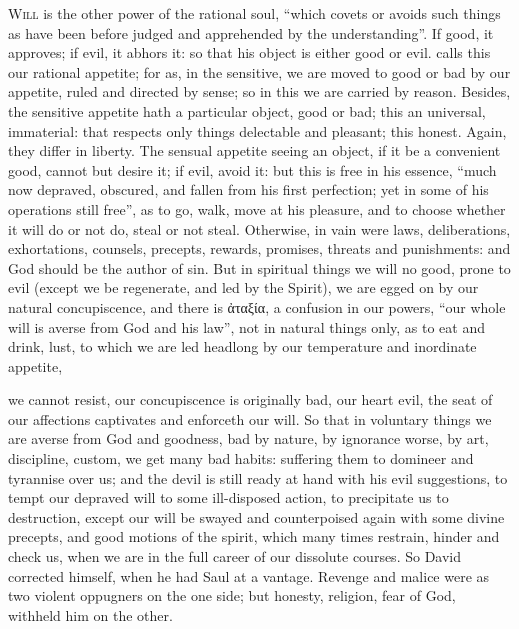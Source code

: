 \lettrine{W}{ill} is the other power of the rational soul,
\enquote{which covets or avoids such things as have been before
judged and apprehended by the understanding}. If good, it approves; if evil, it
abhors it: so that his object is either good or evil. \Aristotle{} calls this our
rational appetite; for as, in the sensitive, we are moved to good or bad by our
appetite, ruled and directed by sense; so in this we are carried by reason.
Besides, the sensitive appetite hath a particular object, good or bad; this an
universal, immaterial: that respects only things delectable and pleasant; this
honest. Again, they differ in liberty. The sensual appetite seeing an object,
if it be a convenient good, cannot but desire it; if evil, avoid it: but this
is free in his essence, \enquote{much now depraved, obscured, and
fallen from his first perfection; yet in some of his operations still free}, as
to go, walk, move at his pleasure, and to choose whether it will do or not do,
steal or not steal. Otherwise, in vain were laws, deliberations, exhortations,
counsels, precepts, rewards, promises, threats and punishments: and God should
be the author of sin. But in spiritual things we will no
good, prone to evil (except we be regenerate, and led by the Spirit), we are
egged on by our natural concupiscence, and there is \textgreek{ἀταξία}, a
confusion in our powers, \enquote{our whole will is averse from
God and his law}, not in natural things only, as to eat and drink, lust, to
which we are led headlong by our temperature and inordinate appetite,


we cannot resist, our concupiscence is originally bad, our heart evil, the seat
of our affections captivates and enforceth our will. So that in voluntary
things we are averse from God and goodness, bad by nature, by
ignorance worse, by art, discipline, custom, we get many
bad habits: suffering them to domineer and tyrannise over us; and the devil is
still ready at hand with his evil suggestions, to tempt our depraved will to
some ill-disposed action, to precipitate us to destruction, except our will be
swayed and counterpoised again with some divine precepts, and good motions of
the spirit, which many times restrain, hinder and check us, when we are in the
full career of our dissolute courses. So David corrected himself, when he had
Saul at a vantage. Revenge and malice were as two violent oppugners on the one
side; but honesty, religion, fear of God, withheld him on the other.


